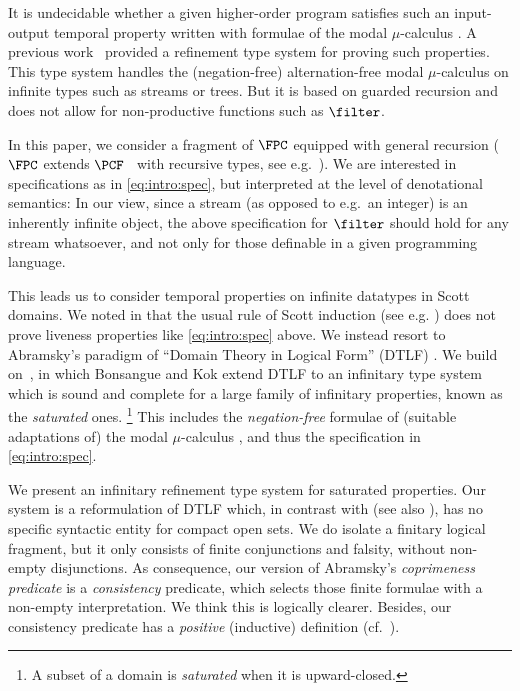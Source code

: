 It is undecidable whether a given higher-order program satisfies
such an input-output temporal property written with formulae
of the modal $\mu$-calculus \cite{ktu10popl}.
A previous work~\cite{jr21esop}
provided a refinement type system for proving such properties.
This type system handles the (negation-free) alternation-free modal $\mu$-calculus
on infinite types such as streams or trees.
But it is based on guarded recursion
and does not allow for non-productive functions such as $\filter$.


In this paper, we consider a fragment of $\FPC$ equipped with general
recursion ($\FPC$ extends $\PCF$~\cite{plotkin77tcs} with
recursive types, see e.g.\ \cite{pierce02book}).
%
We are interested in specifications as in \eqref{eq:intro:spec},
but interpreted at the level of denotational semantics:
In our view, since a stream (as opposed to e.g.\ an integer)
is an inherently infinite object, the above specification for $\filter$
should hold for any stream whatsoever, and not only
for those definable in a given programming language.

This leads us to consider temporal properties
on infinite datatypes in Scott domains.
We noted in \cite{rs24jfla} that the usual rule of Scott induction
(see e.g. \cite[\S 6.2]{ac98book}) does not prove liveness
properties like \eqref{eq:intro:spec} above.
We instead resort to Abramsky's paradigm of
``Domain Theory in Logical Form'' (DTLF) \cite{abramsky91apal}.
%
We build on~\cite{bk03ic}, in which Bonsangue and Kok extend DTLF
to an infinitary type system which is sound and complete for
a large family of infinitary properties, known as the \emph{saturated} ones.%
\footnote{A subset of a domain is \emph{saturated} when it is upward-closed.}
%
This includes
the \emph{negation-free} formulae of
(suitable adaptations of) the modal $\mu$-calculus \cite{rs24jfla},
and thus the specification in \eqref{eq:intro:spec}.


We present an infinitary refinement type system for saturated properties.
Our system is a reformulation of DTLF which,
in contrast with \cite{abramsky91apal,bk03ic}
(see also \cite[\S 10.5]{ac98book}),
has no specific syntactic entity for compact open sets.
We do isolate a finitary logical fragment,
but it only consists of finite conjunctions and falsity,
without non-empty disjunctions.
As consequence, our version of Abramsky's \emph{coprimeness predicate}
is a \emph{consistency} predicate,
which selects those finite formulae with a non-empty interpretation.
We think this is logically clearer.
Besides, our consistency predicate has a \emph{positive} (inductive) definition
(cf.\ \cite{bk03ic,ac98book}).


